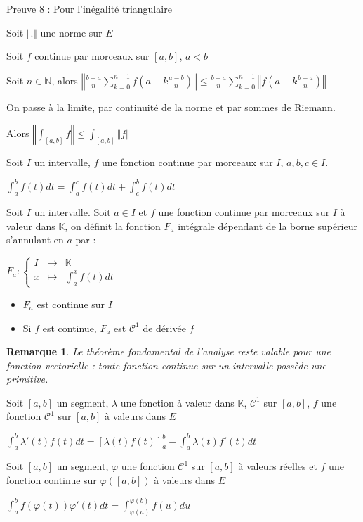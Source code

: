 \documentclass[a4paper,12pt]{book}
\newcommand{\Prop}[2]{\begin{tcolorbox}[sharp corners, colback=white,colframe=red!90!black!75, title=Proposition : #1]#2\end{tcolorbox}}
\newcommand{\Pre}[1]{\begin{tcolorbox}[sharp corners, colback=white,colframe=green!60!green!30!black!75, title=Preuve]#1\end{tcolorbox}}
\newtheorem{Rem}{Remarque}[section]
\def\N{\mathbb{N}}
\def\K{\mathbb{K}}
\begin{document}
\Pre{Preuve 8 : Pour l'inégalité triangulaire \par Soit $\Vert.\Vert$ une norme sur $E$ \par Soit $f$ continue par morceaux sur $[a,b]$, $a<b$ \par Soit $n\in\N$, alors $\left\Vert\frac{b-a}{n}\sum\limits_{k=0}^{n-1}f\left(a+k\frac{a-b}{n}\right)\right\Vert\leq \frac{b-a}{n}\sum\limits_{k=0}^{n-1}\left\Vert f\left(a+k\frac{b-a}{n}\right)\right\Vert$ \par On passe à la limite, par continuité de la norme et par sommes de Riemann. \par Alors $\left\Vert \int_{[a,b]}f\right\Vert \leq \int_{[a,b]}\Vert f\Vert$}
\Prop{Chasles}{Soit $I$ un intervalle, $f$ une fonction continue par morceaux sur $I$, $a,b,c\in I$. \par\begin{center}$\int_a^bf(t)dt=\int_a^cf(t)dt+\int_c^bf(t)dt$\end{center}}
\Prop{}{Soit $I$ un intervalle. Soit $a\in I$ et $f$ une fonction continue par morceaux sur $I$ à valeur dans $\K$, on définit la fonction $F_a$ intégrale dépendant de la borne supérieur s'annulant en $a$ par : \par \begin{center}$F_a:\left\{\begin{array}{rcl} I & \to & \K \\ x & \mapsto & \int_a^xf(t)dt\end{array}\right.$\end{center} \begin{itemize}
\item $F_a$ est continue sur $I$
\item Si $f$ est continue, $F_a$ est $\mathcal{C}^1$ de dérivée $f$
\end{itemize}}
\begin{Rem}
Le théorème fondamental de l'analyse reste valable pour une fonction vectorielle : toute fonction continue sur un intervalle possède une primitive.
\end{Rem}
\Prop{Intégration par parties}{Soit $[a,b]$ un segment, $\lambda$ une fonction à valeur dans $\K$, $\mathcal{C}^1$ sur $[a,b]$, $f$ une fonction $\mathcal{C}^1$ sur $[a,b]$ à valeurs dans $E$ \par\begin{center} $\int_a^b\lambda'(t)f(t)dt = [\lambda(t)f(t)]_a^b - \int_a^b\lambda(t)f'(t)dt$\end{center}}
\Prop{Changement de variable}{Soit $[a,b]$ un segment, $\varphi$ une fonction $\mathcal{C}^1$ sur $[a,b]$ à valeurs réelles et $f$ une fonction continue sur $\varphi([a,b])$ à valeurs dans $E$ \par\begin{center} $\int_a^bf(\varphi(t))\varphi'(t)dt = \int_{\varphi(a)}^{\varphi(b)}f(u)du$\end{center}}
\end{document}
